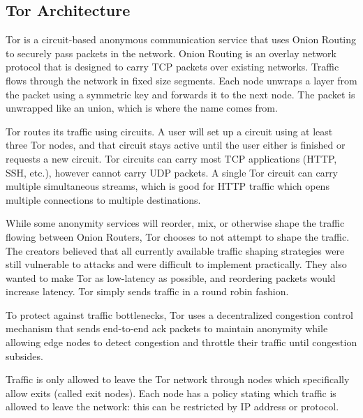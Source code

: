 \documentclass[12pt,journal]{IEEEtran}
\begin{document}
\subsection{Tor Architecture}
Tor is a circuit-based anonymous communication service that uses Onion Routing to securely pass packets in the network. Onion Routing is an overlay network protocol that is designed to carry TCP packets over existing networks. Traffic flows through the network in fixed size segments. Each node unwraps a layer from the packet using a symmetric key and forwards it to the next node. The packet is unwrapped like an union, which is where the name comes from.
\par
Tor routes its traffic using circuits. A user will set up a circuit using at least three Tor nodes, and that circuit stays active until the user either is finished or requests a new circuit. Tor circuits can carry most TCP applications (HTTP, SSH, etc.), however cannot carry UDP packets. A single Tor circuit can carry multiple simultaneous streams, which is good for HTTP traffic which opens multiple connections to multiple destinations.
\par
While some anonymity services will reorder, mix, or otherwise shape the traffic flowing between Onion Routers, Tor chooses to not attempt to shape the traffic. The creators believed that all currently available traffic shaping strategies were still vulnerable to attacks and were difficult to implement practically. They also wanted to make Tor as low-latency as possible, and reordering packets would increase latency. Tor simply sends traffic in a round robin fashion.
\par
To protect against traffic bottlenecks, Tor uses a decentralized congestion control mechanism that sends end-to-end ack packets to maintain anonymity while allowing edge nodes to detect congestion and throttle their traffic until congestion subsides.
\par
Traffic is only allowed to leave the Tor network through nodes which specifically allow exits (called exit nodes). Each node has a policy stating which traffic is allowed to leave the network: this can be restricted by IP address or protocol. \cite{Dingledine:2004:TSO:1251375.1251396}
\end{document}
